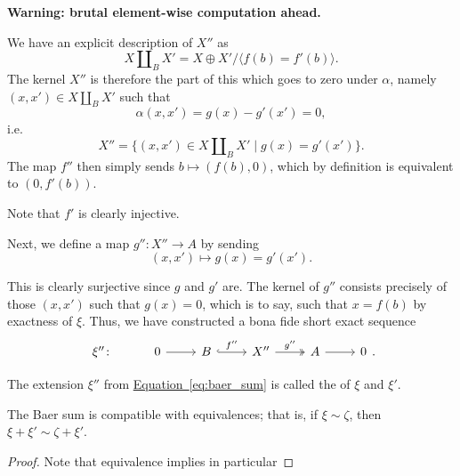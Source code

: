 \documentclass[main.tex]{subfiles}
\begin{document}
\textbf{Warning: brutal element-wise computation ahead.}

We have an explicit description of $X''$ as
\begin{equation*}
  X \amalg_{B} X' = X \oplus X' / \langle f(b) = f'(b) \rangle.
\end{equation*}
The kernel $X''$ is therefore the part of this which goes to zero under $\alpha$, namely $(x, x') \in X \amalg_{B} X'$ such that
\begin{equation*}
  \alpha(x, x') = g(x) - g'(x') = 0,
\end{equation*}
i.e.
\begin{equation*}
  X'' = \{(x, x') \in X \amalg_{B} X' \mid g(x) = g'(x')\}.
\end{equation*}
The map $f''$ then simply sends $b \mapsto (f(b), 0)$, which by definition is equivalent to $(0, f'(b))$.

Note that $f'$ is clearly injective.

Next, we define a map $g''\colon X'' \to A$ by sending
\begin{equation*}
  (x, x') \mapsto g(x) = g'(x').
\end{equation*}

This is clearly surjective since $g$ and $g'$ are. The kernel of $g''$ consists precisely of those $(x, x')$ such that $g(x) = 0$, which is to say, such that $x = f(b)$ by exactness of $\xi$. Thus, we have constructed a bona fide short exact sequence
\begin{equation}
  \label{eq:baer_sum}
  \begin{tikzcd}
    \xi''\colon
    & 0
    \arrow[r]
    & B
    \arrow[r, hook, "f''"]
    & X''
    \arrow[r, two heads, "g''"]
    & A
    \arrow[r]
    & 0
  \end{tikzcd}.
\end{equation}

\begin{definition}
  \label{def:baer_sum}
  The extension $\xi''$ from \hyperref[eq:baer_sum]{Equation~\ref*{eq:baer_sum}} is called the  of $\xi$ and $\xi'$.
\end{definition}

\begin{lemma}
  \label{lemma:baer_sum_compatible_with_equivalences}
  The Baer sum is compatible with equivalences; that is, if $\xi \sim \zeta$, then $\xi + \xi' \sim \zeta + \xi'$.
\end{lemma}
\begin{proof}
  Note that equivalence implies in particular
\end{proof}
\end{document}
